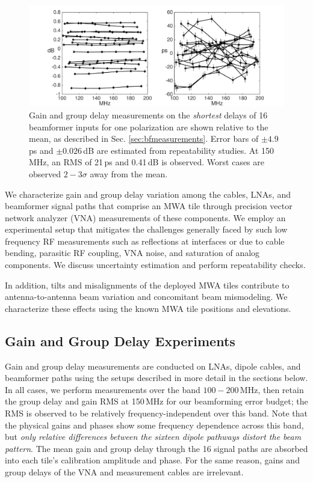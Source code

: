 \begin{figure}[h]
\centering
\includegraphics[width=6in]{chap2_beamforming_errors/bf00000_gains_and_delays-eps-converted-to.pdf}
\caption[Gain and group delay measurements on the \textit{shortest} delays of 16 beamformer inputs for one polarization are shown relative to the mean.]{Gain and group delay measurements on the \textit{shortest} delays of 16 beamformer inputs for one polarization are shown relative to the mean, as described in Sec. \ref{sec:bfmeasurements}. Error bars of $\pm4.9$ps and $\pm0.026$\,dB are estimated from repeatability studies. At 150\,MHz, an RMS of 21\,ps and 0.41\,dB is observed. Worst cases are observed $2-3\sigma$ away from the mean.}
\label{fig:bf00000plot}
\end{figure}

We characterize gain and group delay variation among the cables, LNAs, and beamformer signal paths that comprise an MWA tile through precision vector network analyzer (VNA) measurements of these components. We employ an experimental setup that mitigates the challenges generally faced by such low frequency RF measurements such as reflections at interfaces or due to cable bending, parasitic RF coupling, VNA noise, and saturation of analog components. We discuss uncertainty estimation and perform repeatability checks.

In addition, tilts and misalignments of the deployed MWA tiles contribute to antenna-to-antenna beam variation and concomitant beam mismodeling. We characterize these effects using the known MWA tile positions and elevations.

\subsection{Gain and Group Delay Experiments}

Gain and group delay measurements are conducted on LNAs, dipole cables, and beamformer paths using the setups described in more detail in the sections below. In all cases, we perform measurements over the band $100-200$\,MHz, then retain the group delay and gain RMS at 150\,MHz for our beamforming error budget; the RMS is observed to be relatively frequency-independent over this band. Note that the physical gains and phases show some frequency dependence across this band, but \textit{only relative differences between the sixteen dipole pathways distort the beam pattern}. The mean gain and group delay through the 16 signal paths are absorbed into each tile's calibration amplitude and phase. For the same reason, gains and group delays of the VNA and measurement cables are irrelevant.

